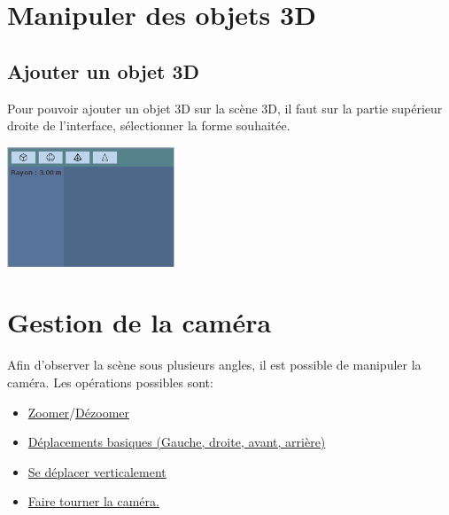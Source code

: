 \documentclass[11pt]{report}
\begin{document}


\tableofcontents


\chapter{Manipuler des objets 3D}

\section{Ajouter un objet 3D}
Pour pouvoir ajouter un objet 3D sur la scène 3D, il faut sur la partie supérieur droite de l'interface, sélectionner la forme souhaitée.
\newline

\begin{center}
    \includegraphics[width=5cm]{ajoutFormes}
\end{center}


\chapter{Gestion de la caméra}


Afin d'observer la scène sous plusieurs angles, il est possible de manipuler la caméra. Les opérations possibles sont:
\begin{itemize}
        \item \hyperlink{zoom}{Zoomer}/\hyperlink{dezoom}{Dézoomer}
        \item \hyperlink{move}{Déplacements basiques (Gauche, droite, avant, arrière)}
        \item \hyperlink{moveV}{Se déplacer verticalement}
        \item \hyperlink{rotate}{Faire tourner la caméra.}
\end{itemize}
\end{document}
